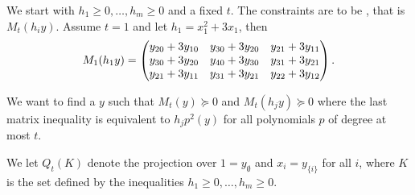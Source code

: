\documentclass[a4paper,twoside,justified]{tufte-handout}
\begin{document}
We start with $h_1\geq0,\ldots,h_m\geq0$ and a fixed $t$. The constraints are to be , that is $M_t(h_iy).$ Assume $t=1$ and let $h_1=x_1^2+3x_1$, then
\begin{eqnarray*}
M_1(h_1y)=
\begin{pmatrix}
                        y_{20}+3y_{10}  & y_{30}+3y_{20}  & y_{21}+3y_{11}\cr
               y_{30}+3y_{20}  & y_{40}+3y_{30} & y_{31}+3y_{21}\cr
                 y_{21}+3y_{11} & y_{31}+3y_{21}& y_{22}+3y_{12}\cr
\end{pmatrix}.
\end{eqnarray*} 

We want to find a $y$ such that $M_t(y)\succeq0$ and $M_t(h_jy)\succeq0$ where the last matrix inequality is equivalent to $h_jp^2(y)$ for all polynomials $p$ of degree at most $t$.

We let $Q_t(K)$ denote the projection over $1=y_{\emptyset}$ and $x_i=y_{\{i\}}$ for all $i$, where $K$ is the set defined by the inequalities $h_1\geq0,\ldots,h_m\geq0$. 








\end{document}
